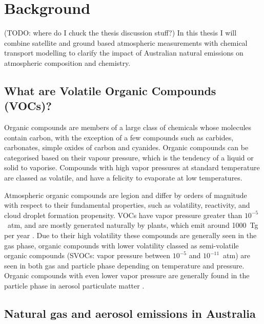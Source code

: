 
\chapter{Background} %
\label{ch1}

(TODO: where do I chuck the thesis discussion stuff?)
In this thesis I will combine satellite and ground based atmospheric measurements with chemical transport modelling to clarify the impact of Australian natural emissions on atmospheric composition and chemistry.

\section{What are Volatile Organic Compounds (VOCs)?}
\label{ch1:sec:what_are_vocs}
  Organic compounds are members of a large class of chemicals whose molecules contain carbon, with the exception of a few compounds such as carbides, carbonates, simple oxides of carbon and cyanides.
  Organic compounds can be categorised based on their vapour pressure, which is the tendency of a liquid or solid to vaporise.
  Compounds with high vapor pressures at standard temperature are classed as volatile, and have a felicity to evaporate at low temperatures.
  
  Atmospheric organic compounds are legion and differ by orders of magnitude with respect to their fundamental properties, such as volatility, reactivity, and cloud droplet formation propensity.
  VOCs have vapor pressure greater than $10^{-5}$~atm, and are mostly generated naturally by plants, which emit around 1000~Tg per year \citep{Guenther1995, Glasius2016}.
  Due to their high volatility these compounds are generally seen in the gas phase, organic compounds with lower volatility classed as semi-volatile organic compounds (SVOCs: vapor pressure between $10^{-5}$ and $10^{-11}$~atm) are seen in both gas and particle phase depending on temperature and pressure.
  Organic compounds with even lower vapor pressure are generally found in the particle phase in aerosol particulate matter \citep{Glasius2016}.


\section{Natural gas and aerosol emissions in Australia}
\label{ch1:sec:emissions}

